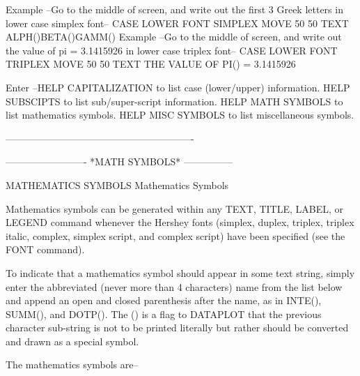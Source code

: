 Example --Go to the middle of screen, and write out the first 3 Greek
          letters in lower case simplex font--
             CASE LOWER
             FONT SIMPLEX
             MOVE 50 50
             TEXT ALPH()BETA()GAMM()
Example --Go to the middle of screen, and write out the value of
          pi = 3.1415926 in lower case triplex font--
             CASE LOWER
             FONT TRIPLEX
             MOVE 50 50
             TEXT THE VALUE OF PI() = 3.1415926
 
Enter   --HELP CAPITALIZATION to list case (lower/upper) information.
          HELP SUBSCIPTS to list sub/super-script information.
          HELP MATH SYMBOLS to list mathematics symbols.
          HELP MISC SYMBOLS to list miscellaneous symbols.
 
----------------------------------------------------------
 
 
 
 
 
 
 
 
 
 
 
 
 
 
 
 
 
 
 
 
 
 
 
 
 
 
 
 
 
 
 
 
 
 
-------------------------  *MATH SYMBOLS*  ---------------
 
MATHEMATICS SYMBOLS
Mathematics Symbols
 
Mathematics symbols can be generated within any TEXT, TITLE, LABEL, or
LEGEND command whenever the Hershey fonts (simplex, duplex, triplex,
triplex italic, complex, simplex script, and complex script) have been
specified (see the FONT command).
 
To indicate that a mathematics symbol should appear in some text
string, simply enter the abbreviated (never more than 4 characters)
name from the list below and append an open and closed parenthesis
after the name, as in INTE(), SUMM(), and DOTP().  The () is a flag to
DATAPLOT that the previous character sub-string is not to be printed
literally but rather should be converted and drawn as a special symbol.
 
The mathematics symbols are--
 
